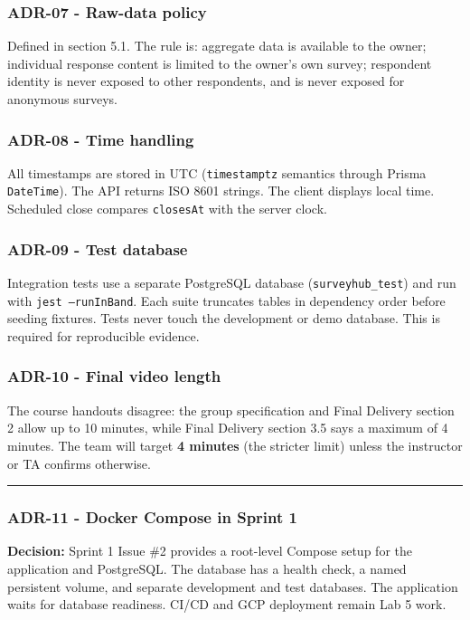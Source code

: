 \documentclass[12pt,a4paper]{article}
\begin{document}
\subsubsection*{ADR-07 - Raw-data policy}
Defined in section 5.1. The rule is: aggregate data is available to the owner; individual response content is limited to the owner's own survey; respondent identity is never exposed to other respondents, and is never exposed for anonymous surveys.

\subsubsection*{ADR-08 - Time handling}
All timestamps are stored in UTC (\texttt{timestamptz} semantics through Prisma \texttt{DateTime}). The API returns ISO 8601 strings. The client displays local time. Scheduled close compares \texttt{closesAt} with the server clock.

\subsubsection*{ADR-09 - Test database}
Integration tests use a separate PostgreSQL database (\texttt{surveyhub\_test}) and run with \texttt{jest --runInBand}. Each suite truncates tables in dependency order before seeding fixtures. Tests never touch the development or demo database. This is required for reproducible evidence.

\subsubsection*{ADR-10 - Final video length}
The course handouts disagree: the group specification and Final Delivery section 2 allow up to 10 minutes, while Final Delivery section 3.5 says a maximum of 4 minutes. The team will target \textbf{4 minutes} (the stricter limit) unless the instructor or TA confirms otherwise.

\medskip\noindent\rule{\linewidth}{0.4pt}\medskip

\subsubsection*{ADR-11 - Docker Compose in Sprint 1}
\textbf{Decision:} Sprint 1 Issue \#2 provides a root-level Compose setup for the application and PostgreSQL. The database has a health check, a named persistent volume, and separate development and test databases. The application waits for database readiness. CI/CD and GCP deployment remain Lab 5 work.
\end{document}
